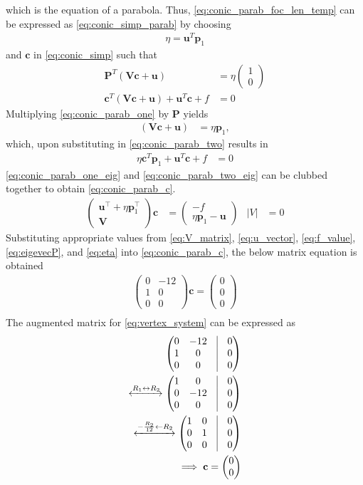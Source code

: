 \documentclass[journal,10pt,twocolumn]{article}
\providecommand{\abs}[1]{\left\vert#1\right\vert}
\let\vec\mathbf
\newcommand{\myvec}[1]{\ensuremath{\begin{pmatrix}#1\end{pmatrix}}}
\providecommand{\brak}[1]{\ensuremath{\left(#1\right)}}
\begin{document}
which is the equation of a parabola. 
Thus, \eqref{eq:conic_parab_foc_len_temp} 
can be expressed as \eqref{eq:conic_simp_parab} by choosing
\begin{align}
\eta = \vec{u}^T\vec{p}_1
\end{align}
and $\vec{c}$ in \eqref{eq:conic_simp} such that
\begin{align}
\label{eq:conic_parab_one}
\vec{P}^{T}\brak{\vec{V}\vec{c}+\vec{u}} &= \eta\myvec{1\\0}
\\
\vec{c}^T\brak{\vec{V}\vec{c} + \vec{u}}+ \vec{u}^T\vec{c} + f&= 0
\label{eq:conic_parab_two}
\end{align}
Multiplying \eqref{eq:conic_parab_one} by $\vec{P}$ yields
\begin{align}
\label{eq:conic_parab_one_eig}
\brak{\vec{V}\vec{c}+\vec{u}} &= \eta\vec{p}_1,
\end{align}
which, upon substituting in \eqref{eq:conic_parab_two}
results in 
\begin{align}
\eta\vec{c}^T\vec{p}_1 + \vec{u}^T\vec{c} + f&= 0
\label{eq:conic_parab_two_eig}
\end{align}
\eqref{eq:conic_parab_one_eig} and \eqref{eq:conic_parab_two_eig} can be clubbed together to obtain \eqref{eq:conic_parab_c}.
\begin{align}
    \myvec{ \vec{u}^{\top}+\eta\vec{p}_1^{\top} \\ \vec{V}}\vec{c} &= \myvec{-f \\ \eta\vec{p}_1-\vec{u}}  &\abs{V} &= 0
    \label{eq:conic_parab_c}
    \end{align}
Substituting appropriate values from \eqref{eq:V_matrix}, \eqref{eq:u_vector}, \eqref{eq:f_value}, \eqref{eq:eigevecP}, and \eqref{eq:eta} into \eqref{eq:conic_parab_c}, the below matrix equation is obtained
\begin{align}
	\label{eq:vertex_system}
	\myvec{0&-12\\1& 0\\0& 0}\vec{c} = \myvec{0 \\0 \\0}\\
\end{align}
The augmented matrix for \eqref{eq:vertex_system} can be expressed as
\begin{align}
	\label{eq:vertex_solv1}
	\myvec{0&-12&\vrule&0\\1&0&\vrule&0\\0&0&\vrule&0}\\ 	
	\label{eq:vertex_solv2}
	\xleftrightarrow[]{R_1 \leftrightarrow R_2}\myvec{1&0&\vrule&0\\0&-12&\vrule&0\\0&0&\vrule&0}\\
	\label{eq:vertex_solv3}
	\xleftrightarrow[]{-\frac{R_2}{12} \leftarrow R_2}\myvec{1&0&\vrule&0\\0&1&\vrule&0\\0&0&\vrule&0}\\
	\label{eq:vertex_solv4}
	\implies\vec{c} = \myvec{0\\0}
\end{align}
\end{document}
